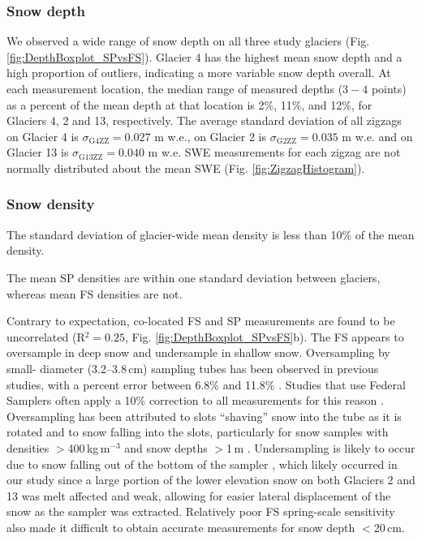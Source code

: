 \documentclass[twocolumn, letterpaper]{igs}
\begin{document}
\subsubsection{Snow depth}
We observed a wide range of snow depth on all three study glaciers (Fig. \ref{fig:DepthBoxplot_SPvsFS}). Glacier 4 has the highest mean snow depth and a high proportion of outliers, indicating a more variable snow depth overall. At each measurement location, the median range of measured depths ($3-4$ points) as a percent of the mean depth at that location is 2\%, 11\%, and 12\%, for Glaciers 4, 2 and 13, respectively. The average standard deviation of all zigzags on Glacier 4 is $\sigma_{\mathrm{G4ZZ}} =  0.027$ m w.e., on Glacier 2 is $\sigma_{\mathrm{G2ZZ}} =  0.035$ m w.e. and on Glacier 13 is $\sigma_{\mathrm{G13ZZ}} =  0.040$ m w.e. SWE measurements for each zigzag are not normally distributed about the mean SWE (Fig. \ref{fig:ZigzagHistogram}).

\subsubsection{Snow density}


The standard deviation of glacier-wide mean density is less than 10\% of the mean density. 

The mean SP densities are within one standard deviation between glaciers, whereas mean FS densities are not. 


Contrary to expectation, co-located FS and SP measurements are found to be uncorrelated (R$^2=0.25$, Fig. \ref{fig:DepthBoxplot_SPvsFS}b). The FS appears to oversample in deep snow and undersample in shallow snow. Oversampling by small- diameter (3.2--3.8\,cm) sampling tubes has been observed in previous studies, with a percent error between 6.8\% and 11.8\% \citep[e.g.][]{Work1965, Fames1982, Conger2009}. Studies that use Federal Samplers often apply a 10\% correction to all measurements for this reason \citep[e.g.][]{Molotch2005}. Oversampling has been attributed to slots ``shaving'' snow into the tube as it is rotated \citep[e.g.][]{Dixon2012} and to snow falling into the slots, particularly for snow samples with densities $>$400\,kg\,m$^{-3}$ and snow depths $>$1\,m \citep[e.g.][]{Beaumont1963}. Undersampling is likely to occur due to snow falling out of the bottom of the sampler \citep{Turcan1975}, which likely occurred in our study since a large portion of the lower elevation snow on both Glaciers 2 and 13 was melt affected and weak, allowing for easier lateral displacement of the snow as the sampler was extracted. Relatively poor FS spring-scale sensitivity also made it difficult to obtain accurate measurements for snow depth $<$20\,cm.
\end{document}
